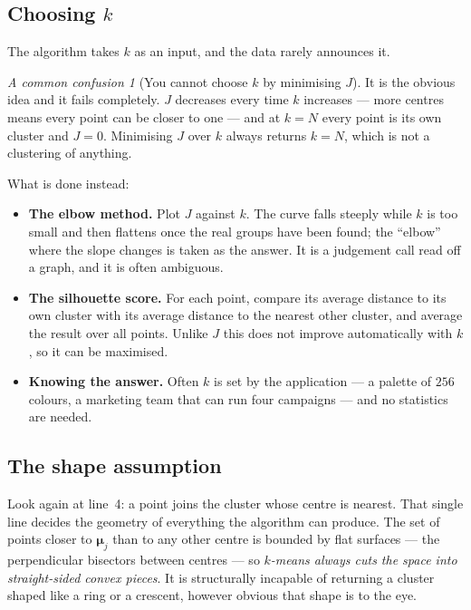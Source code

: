 \documentclass[11pt]{article}
\theoremstyle{plain}
\theoremstyle{definition}
\theoremstyle{remark}
\newtheorem*{warn}{A common confusion}
\newcommand{\bmu}{\boldsymbol{\mu}}
\begin{document}
\subsection{Choosing $k$}
The algorithm takes $k$ as an input, and the data rarely announces it.

\begin{warn}[You cannot choose $k$ by minimising $J$]
It is the obvious idea and it fails completely. $J$ decreases every time $k$
increases --- more centres means every point can be closer to one --- and at
$k=N$ every point is its own cluster and $J=0$. Minimising $J$ over $k$ always
returns $k=N$, which is not a clustering of anything.
\end{warn}

\noindent What is done instead:

\begin{itemize}[leftmargin=1.4em,itemsep=4pt]
  \item \textbf{The elbow method.} Plot $J$ against $k$. The curve falls
        steeply while $k$ is too small and then flattens once the real groups
        have been found; the ``elbow'' where the slope changes is taken as the
        answer. It is a judgement call read off a graph, and it is often
        ambiguous.
  \item \textbf{The silhouette score.} For each point, compare its average
        distance to its own cluster with its average distance to the nearest
        other cluster, and average the result over all points. Unlike $J$ this
        does not improve automatically with $k$, so it can be maximised.
  \item \textbf{Knowing the answer.} Often $k$ is set by the application --- a
        palette of $256$ colours, a marketing team that can run four campaigns
        --- and no statistics are needed.
\end{itemize}

\subsection{The shape assumption}
Look again at line~4: a point joins the cluster whose centre is nearest. That
single line decides the geometry of everything the algorithm can produce. The
set of points closer to $\bmu_j$ than to any other centre is bounded by flat
surfaces --- the perpendicular bisectors between centres --- so \emph{$k$-means
always cuts the space into straight-sided convex pieces}. It is structurally
incapable of returning a cluster shaped like a ring or a crescent, however
obvious that shape is to the eye.
\end{document}
